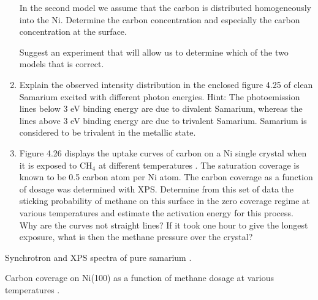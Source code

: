 \begin{enumerate}
             In the second model we assume that the carbon is
          distributed homogeneously into the Ni. Determine the carbon
          concentration and especially the carbon concentration at the
          surface.

             Suggest an experiment that will allow us to determine
          which of the two models that is correct.



             \item Explain the observed intensity distribution in the
          enclosed figure 4.25 of clean Samarium excited with
          different photon energies. Hint: The photoemission lines
          below 3 eV binding energy are due to divalent Samarium,
          whereas the lines above 3 eV binding energy are due to
          trivalent Samarium. Samarium is considered to be trivalent
          in the metallic state.





             \item Figure 4.26 displays the uptake curves of carbon on a
          Ni single crystal when it is exposed to CH$_{4}$ at
          different temperatures \cite{chorkendorff2}. The saturation coverage
          is known to be 0.5 carbon atom per Ni atom. The carbon
          coverage as a function of dosage was determined with
          XPS. Determine from this set of data the sticking
          probability of methane on this surface in the zero coverage
          regime at various temperatures and estimate the activation
          energy for this process. Why are the curves not straight lines?
          If it took one hour to give the longest exposure, what is
          then the methane pressure over the crystal?





\end{enumerate}


\vspace{12cm}
           Synchrotron and XPS  spectra  of
          pure samarium \cite{gerken}.

          \newpage
          \vspace*{13cm}
           Carbon coverage on Ni(100) as  a
          function of methane dosage at various temperatures \cite{chorkendorff2}.


